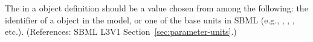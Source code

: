 The  in a \Parameter object definition should be a value
chosen from among the following: the identifier of a \UnitDefinition object
in the model, or one of the base units in SBML (e.g., ,
, , etc.).  (References: SBML L3V1
Section~\ref{sec:parameter-units}.)

